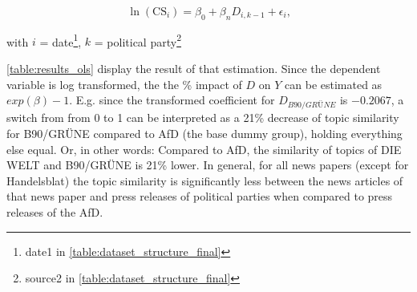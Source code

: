 \documentclass[
]{article}
\begin{document}
\[
\ln(\text{CS}_{i})=\beta_0+\beta_nD_{i,k-1}+\epsilon_i\text{,}
\]

with \(i\) = date\footnote{date1 in
  \autoref{table:dataset_structure_final}}, \(k\) = political
party\footnote{source2 in \autoref{table:dataset_structure_final}}

\autoref{table:results_ols} display the result of that estimation. Since
the dependent variable is log transformed, the the \% impact of \(D\) on
\(Y\) can be estimated as \(exp(\beta)-1\). E.g. since the transformed
coefficient for \(D_{B90/GRÜNE}\) is \(-0.2067\), a switch from from 0
to 1 can be interpreted as a 21\% decrease of topic similarity for
B90/GRÜNE compared to AfD (the base dummy group), holding everything
else equal. Or, in other words: Compared to AfD, the similarity of
topics of DIE WELT and B90/GRÜNE is 21\% lower. In general, for all news
papers (except for Handelsblat) the topic similarity is significantly
less between the news articles of that news paper and press releases of
political parties when compared to press releases of the AfD.
\end{document}
